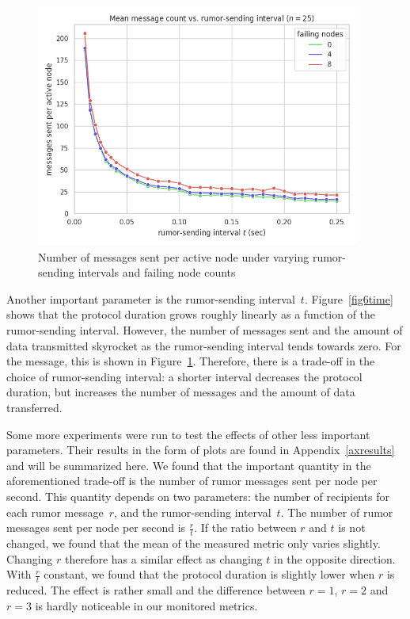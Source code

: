 \begin{figure}[!htbp]
    \centering
    \includegraphics[width=0.95\textwidth]{figures/6/bandwidth_msg_tx_sum_by_gossip_tick_big.png}
    \caption{Number of messages sent per active node under varying rumor-sending intervals and failing node counts}
    \label{fig6msg}
\end{figure}

Another important parameter is the rumor-sending interval~$t$.
Figure~\ref{fig6time} shows that the protocol duration grows roughly linearly as a function of the rumor-sending interval.
However, the number of messages sent and the amount of data transmitted skyrocket as the rumor-sending interval tends towards zero.
For the message, this is shown in Figure~\ref{fig6msg}.
Therefore, there is a trade-off in the choice of rumor-sending interval: a shorter interval decreases the protocol duration, but increases the number of messages and the amount of data transferred.

Some more experiments were run to test the effects of other less important parameters.
Their results in the form of plots are found in Appendix~\ref{axresults} and will be summarized here.
We found that the important quantity in the aforementioned trade-off is the number of rumor messages sent per node per second.
This quantity depends on two parameters: the number of recipients for each rumor message~$r$, and the rumor-sending interval~$t$.
The number of rumor messages sent per node per second is $\frac{r}{t}$.
If the ratio between $r$ and $t$ is not changed, we found that the mean of the measured metric only varies slightly.
Changing $r$ therefore has a similar effect as changing $t$ in the opposite direction.
With $\frac{r}{t}$ constant, we found that the protocol duration is slightly lower when $r$ is reduced.
The effect is rather small and the difference between $r = 1$, $r = 2$ and $r = 3$ is hardly noticeable in our monitored metrics.


